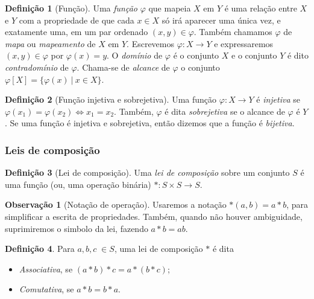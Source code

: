 \documentclass[a4paper,12pt]{report}
\theoremstyle{plain}
\theoremstyle{definition}
\newtheorem{definicao}{Definição}[section]
\newtheorem{observacao}{Observação}[section]
\begin{document}
	\begin{definicao}[Função]
			Uma \emph{função} $\varphi$ que mapeia $X$ em $Y$ é uma relação entre $X$ e $Y$ com a propriedade de que cada $x\in X$ só irá aparecer uma única vez, e exatamente uma, em um par ordenado $(x,y)\in \varphi$. Também chamamos $\varphi$ de \emph{mapa} ou \emph{mapeamento} de $X$ em $Y$. Escrevemos $\varphi: X\longrightarrow Y$ e expressaremos $(x,y)\in\varphi$ por $\varphi(x) = y$. O \emph{domínio} de $\varphi$ é o conjunto $X$ e o conjunto $Y$ é dito \emph{contradomínio} de $\varphi$. Chama-se de \emph{alcance} de $\varphi$ o conjunto $\varphi[X] = \{\varphi(x)\ | \ x \in X\}.$
	\end{definicao}
	
	\begin{definicao}[Função injetiva e sobrejetiva]
			Uma função $\varphi: X \longrightarrow Y$ é \emph{injetiva} se $\varphi(x_1) = \varphi(x_2) \iff x_1 = x_2$. Também, $\varphi$ é dita \emph{sobrejetiva} se o alcance de $\varphi$ é $Y$. Se uma função é injetiva e sobrejetiva, então dizemos que a função é \emph{bijetiva}.
	\end{definicao}
	
	\subsubsection*{Leis de composição}
	
	\begin{definicao}[Lei de composição]
		Uma \emph{lei de composição} sobre um conjunto \(S\) é uma função (ou, uma operação binária) \(*: S\times S \longrightarrow S\).
	\end{definicao}
	
	\begin{observacao}[Notação de operação]
		Usaremos a notação \(*(a,b) = a*b\), para simplificar a escrita de
		propriedades. Também, quando não houver ambiguidade, suprimiremos o simbolo da lei, fazendo $a*b = ab$.
	\end{observacao}
	
	
	\begin{definicao}
		Para $a,b,c \; \in S$, uma lei de composição $*$ é dita
		
		\begin{itemize}
			\item \emph{Associativa}, se $(a*b)*c = a*(b*c)$;
			\item \emph{Comutativa}, se \(a*b = b*a\).
		\end{itemize}
	\end{definicao}
	
\end{document}
